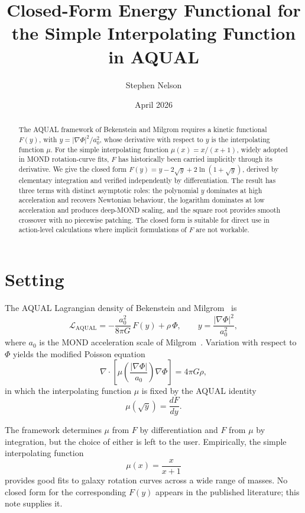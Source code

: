 \documentclass[11pt]{article}
\title{Closed-Form Energy Functional for the Simple Interpolating
Function in AQUAL}
\author{Stephen Nelson}
\affil{Field Dynamics Research \\ \texttt{stephen@fielddynamics.org}}
\date{April 2026}
\begin{document}
\maketitle

\begin{abstract}
The AQUAL framework of Bekenstein and Milgrom requires a kinetic
functional $F(y)$, with $y = |\nabla\Phi|^2/a_0^2$, whose derivative
with respect to $y$ is the interpolating function $\mu$. For the
simple interpolating function $\mu(x) = x/(x+1)$, widely adopted in
MOND rotation-curve fits, $F$ has historically been carried
implicitly through its derivative. We give the closed form
$F(y) = y - 2\sqrt{y} + 2\ln(1 + \sqrt{y})$, derived by elementary
integration and verified independently by differentiation. The
result has three terms with distinct asymptotic roles: the
polynomial $y$ dominates at high acceleration and recovers
Newtonian behaviour, the logarithm dominates at low acceleration
and produces deep-MOND scaling, and the square root provides smooth
crossover with no piecewise patching. The closed form is suitable
for direct use in action-level calculations where implicit
formulations of $F$ are not workable.
\end{abstract}

\section{Setting}

The AQUAL Lagrangian density of Bekenstein and
Milgrom~\cite{BekensteinMilgrom1984} is
\begin{equation}
  \mathcal{L}_{\text{AQUAL}}
  = -\frac{a_0^2}{8\pi G}\, F(y) + \rho\,\Phi,
  \qquad
  y = \frac{|\nabla\Phi|^2}{a_0^2},
\end{equation}
where $a_0$ is the MOND acceleration scale of
Milgrom~\cite{Milgrom1983}. Variation with respect to $\Phi$ yields
the modified Poisson equation
\begin{equation}
  \nabla \cdot \left[\mu\!\left(\frac{|\nabla\Phi|}{a_0}\right)
  \nabla\Phi \right] = 4\pi G\rho,
\end{equation}
in which the interpolating function $\mu$ is fixed by the AQUAL
identity
\begin{equation}
  \mu(\sqrt{y}) = \frac{dF}{dy}.
  \label{eq:aqual_identity}
\end{equation}

The framework determines $\mu$ from $F$ by differentiation and $F$
from $\mu$ by integration, but the choice of either is left to the
user. Empirically, the simple interpolating
function~\cite{FamaeyMcGaugh2012}
\begin{equation}
  \mu(x) = \frac{x}{x+1}
  \label{eq:simple_mu}
\end{equation}
provides good fits to galaxy rotation curves across a wide range of
masses. No closed form for the corresponding $F(y)$ appears in
the published literature; this note supplies it.
\end{document}
